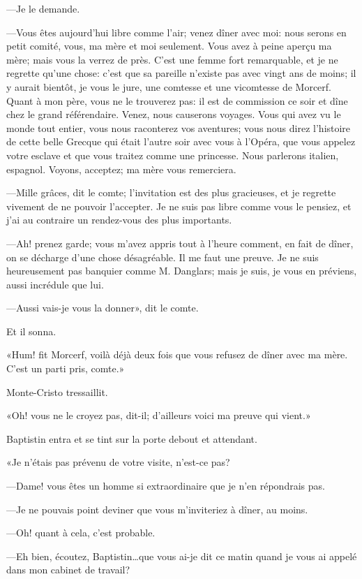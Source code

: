—Je le demande. 

—Vous êtes aujourd'hui libre comme l'air; venez dîner avec moi: nous serons en petit comité, vous, ma mère et moi seulement. Vous avez à peine aperçu ma mère; mais vous la verrez de près. C'est une femme fort remarquable, et je ne regrette qu'une chose: c'est que sa pareille n'existe pas avec vingt ans de moins; il y aurait bientôt, je vous le jure, une comtesse et une vicomtesse de Morcerf. Quant à mon père, vous ne le trouverez pas: il est de commission ce soir et dîne chez le grand référendaire. Venez, nous causerons voyages. Vous qui avez vu le monde tout entier, vous nous raconterez vos aventures; vous nous direz l'histoire de cette belle Grecque qui était l'autre soir avec vous à l'Opéra, que vous appelez votre esclave et que vous traitez comme une princesse. Nous parlerons italien, espagnol. Voyons, acceptez; ma mère vous remerciera. 

—Mille grâces, dit le comte; l'invitation est des plus gracieuses, et je regrette vivement de ne pouvoir l'accepter. Je ne suis pas libre comme vous le pensiez, et j'ai au contraire un rendez-vous des plus importants. 

—Ah! prenez garde; vous m'avez appris tout à l'heure comment, en fait de dîner, on se décharge d'une chose désagréable. Il me faut une preuve. Je ne suis heureusement pas banquier comme M. Danglars; mais je suis, je vous en préviens, aussi incrédule que lui. 

—Aussi vais-je vous la donner», dit le comte. 

Et il sonna. 

«Hum! fit Morcerf, voilà déjà deux fois que vous refusez de dîner avec ma mère. C'est un parti pris, comte.» 

Monte-Cristo tressaillit. 

«Oh! vous ne le croyez pas, dit-il; d'ailleurs voici ma preuve qui vient.» 

Baptistin entra et se tint sur la porte debout et attendant. 

«Je n'étais pas prévenu de votre visite, n'est-ce pas? 

—Dame! vous êtes un homme si extraordinaire que je n'en répondrais pas. 

—Je ne pouvais point deviner que vous m'inviteriez à dîner, au moins. 

—Oh! quant à cela, c'est probable. 

—Eh bien, écoutez, Baptistin\dots que vous ai-je dit ce matin quand je vous ai appelé dans mon cabinet de travail? 

